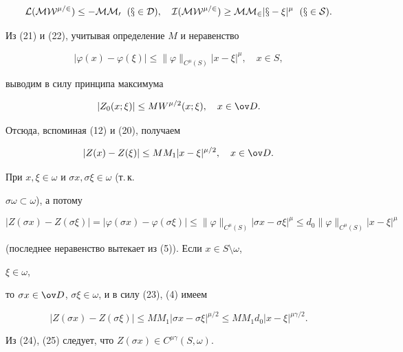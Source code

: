 \begin{pf}
\begin{equation} 


\cal L(M W^{\mu/2})\le -M M_0\ \; (x\in D),\quad 


I(M W^{\mu/2})\ge M M_2|x-\xi|^\mu \ \; (x\in S). 


\end{equation} 


Из (21) и (22), учитывая определение $M$ и неравенство 


$$ 


|\varphi(x)-\varphi(\xi)|\le\|\varphi\|_{C^\mu(S)}|x-\xi|^\mu, 


\quad x\in S, 


$$ 


выводим в силу принципа максимума 


$$ 


|Z_0(x;\xi)|\le M W^{\mu/2}(x;\xi),\quad x\in\ov D. 


$$ 


Отсюда, вспоминая (12) и (20), получаем 


\begin{equation} 


|Z(x)-Z(\xi)|\le M M_1|x-\xi|^{\mu/2},\quad x\in\ov D. 


\end{equation} 


При $x,\xi\in\omega$ и $\sigma x,\sigma\xi\in\omega$ (т.\,к. 


$\sigma\omega\subset\omega$), а потому 


\begin{equation} 


|Z(\sigma x)-Z(\sigma\xi)|=|\varphi(\sigma x)-\varphi(\sigma\xi)|\le 


\|\varphi\|_{C^\mu(S)}|\sigma x-\sigma\xi|^\mu\le 


d_0\|\varphi\|_{C^\mu(S)}|x-\xi|^\mu 


\end{equation} 


(последнее неравенство вытекает из (5)). Если $x\in S\setminus\omega$, 


$\xi\in\omega$, 


то $\sigma x\in\ov D$, $\sigma\xi\in\omega$, и в силу (23), (4) имеем 


\begin{equation} 


|Z(\sigma x)-Z(\sigma\xi)|\le M M_1|\sigma x-\sigma\xi|^{\mu/2}\le 


M M_1d_0|x-\xi|^{\mu\gamma/2}. 


\end{equation} 


Из (24), (25) следует, что $Z(\sigma x)\in C^{\mu\gamma}(S,\omega)$. 


\end{pf} 



